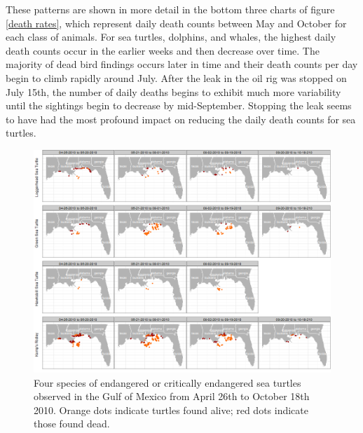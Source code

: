 \documentclass[authoryear,12pt]{elsarticle}
\begin{document}
These patterns are shown in more detail in  the  {bottom three} charts of figure \ref{death rates}, which represent daily death counts between May and October for each class of animals. For sea turtles, dolphins, and whales, the highest daily death counts occur in the earlier weeks and then decrease over time.  The majority of dead bird findings occurs later in time and their death counts per day begin to climb rapidly around July. After the leak  {in the oil rig} was stopped on July 15th, the number of daily deaths  {begins to exhibit much more} variability until {the sightings} begin to decrease by mid-September. Stopping the leak seems to have {had} the most profound impact on reducing the daily death counts for sea turtles. 

\begin{figure}[htbp] %
   \centering
   \includegraphics[width=6in]{turtles.png} 
   \caption{Four species of endangered or critically endangered sea turtles observed in the Gulf of Mexico from April 26th to October 18th 2010.  Orange dots indicate turtles found alive; red dots indicate those found dead.}
   \label{turtles}
\end{figure}
\end{document}
